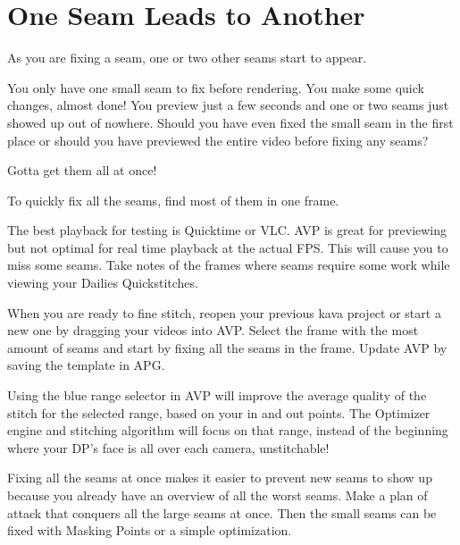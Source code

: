 \chapter{One Seam Leads to Another}
\pagecolor{white}
\label{chap:38}
\begin{fullwidth}

\problem

{\large As you are fixing a seam, one or two other seams start to appear. \par}

You only have one small seam to fix before rendering. You make some quick changes, almost done! You preview just a few seconds and one or two seams just showed up out of nowhere. Should you have even fixed the small seam in the first place or should you have previewed the entire video before fixing any seams?

\solutions

{\large Gotta get them all at once! \par}

To quickly fix all the seams, find most of them in one frame. 


The best playback for testing is Quicktime or VLC. AVP is great for previewing but not optimal for real time playback at the actual FPS. This will cause you to miss some seams. Take notes of the frames where seams require some work while viewing your Dailies Quickstitches.


When you are ready to fine stitch, reopen your previous kava project or start a new one by dragging your videos into AVP. Select the frame with the most amount of seams and start by fixing all the seams in the frame. Update AVP by saving the template in APG.

Using the blue range selector in AVP will improve the average quality of the stitch for the selected range, based on your in and out points. The Optimizer engine and stitching algorithm will focus on that range, instead of the beginning where your DP’s face is all over each camera, unstitchable!


Fixing all the seams at once makes it easier to prevent new seams to show up because you already have an overview of all the worst seams. Make a plan of attack that conquers all the large seams at once. Then the small seams can be fixed with Masking Points or a simple optimization.


\end{fullwidth}
